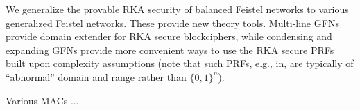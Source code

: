 

We generalize the provable RKA security of balanced Feistel networks to various
generalized Feistel networks.
These provide new theory tools.
Multi-line GFNs provide domain extender for RKA secure blockciphers, while
condensing and expanding GFNs provide more convenient ways to use the RKA
secure PRFs built upon complexity assumptions (note that such PRFs, e.g., in,
are typically of ``abnormal'' domain and range rather than $\{0,1\}^n$).




\medskip{}
Various MACs ...




